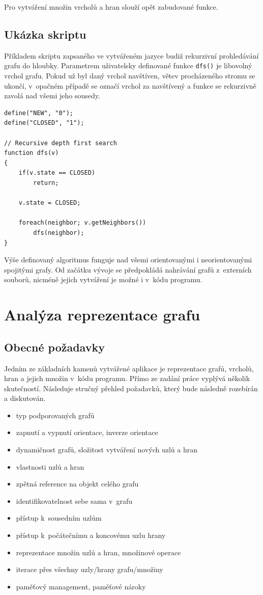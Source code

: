 \documentclass[11pt,twoside,a4paper]{book}
\begin{document}
Pro vytváření množin vrcholů a hran slouží opět zabudované funkce.


\subsection{Ukázka skriptu}

Příkladem skriptu zapsaného ve vytvářeném jazyce budiž rekurzivní pro\-hle\-dá\-vá\-ní grafu do hloubky. Parametrem uživatelsky definované funkce \texttt{dfs()} je libovolný vrchol grafu. Pokud už byl daný vrchol navštíven, větev procházeného stromu se ukončí, v~opačném případě se označí vrchol za navštívený a funkce se rekurzivně zavolá nad všemi jeho sousedy.

\begin{verbatim}
define("NEW", "0");
define("CLOSED", "1");

// Recursive depth first search
function dfs(v)
{
    if(v.state == CLOSED)
        return;

    v.state = CLOSED;

    foreach(neighbor; v.getNeighbors())
        dfs(neighbor);
}
\end{verbatim}


Výše definovaný algoritmus funguje nad všemi orientovanými i neorientovanými spojitými grafy. Od začátku vývoje se předpokládá nahrávání grafů z~externích souborů, nicméně jejich vytváření je možné i v~kódu programu.


\section{Analýza reprezentace grafu}

\subsection{Obecné požadavky}

Jedním ze základních kamenů vytvářené aplikace je reprezentace grafů, vrcholů, hran a jejich množin v~kódu programu. Přímo ze zadání práce vyplývá několik skutečností. Následuje stručný přehled požadavků, který bude následně rozebírán a diskutován.

\begin{itemize}
\item typ podporovaných grafů
\item zapnutí a vypnutí orientace, inverze orientace
\item dynamičnost grafů, složitost vytváření nových uzlů a hran
\item vlastnosti uzlů a hran
\item zpětná reference na objekt celého grafu
\item identifikovatelnost sebe sama v~grafu
\item přístup k~sousedním uzlům
\item přístup k~počátečnímu a koncovému uzlu hrany
\item reprezentace množin uzlů a hran, množinové operace
\item iterace přes všechny uzly/hrany grafu/množiny
\item paměťový management, paměťové nároky
\end{itemize}
\end{document}
